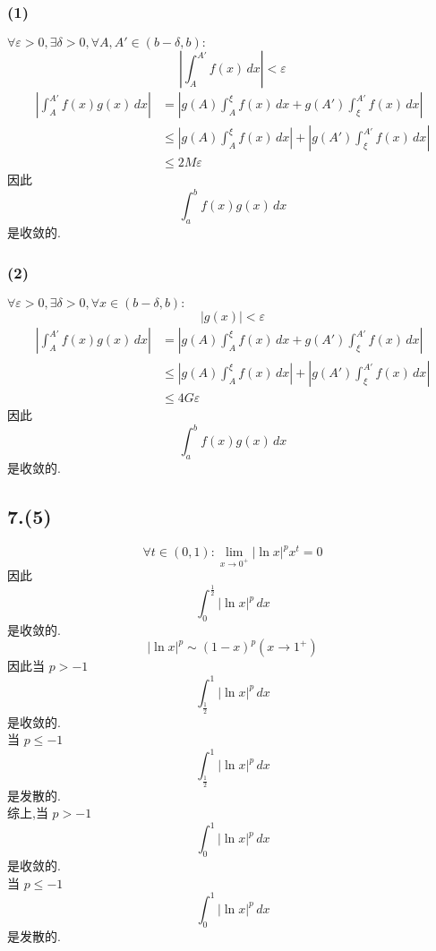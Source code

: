 \documentclass[12pt, a4paper, oneside]{ctexart}
\begin{document}
            \subsubsection*{(1)}
                $\forall \varepsilon > 0, \exists \delta > 0, \forall A,A'\in (b-\delta, b):$
                $$
                    |\int_{A}^{A'}f(x)\,dx|<\varepsilon
                $$
                $$
                    \begin{aligned}
                        |\int_{A}^{A'}f(x)g(x)\,dx|&=|g(A)\int_{A}^{\xi}f(x)\,dx+g(A')\int_{\xi}^{A'}f(x)\,dx|\\
                        &\leq|g(A)\int_{A}^{\xi}f(x)\,dx|+|g(A')\int_{\xi}^{A'}f(x)\,dx|\\
                        &\leq 2M\varepsilon
                    \end{aligned}
                $$
                因此
                $$
                    \int_{a}^{b}f(x)g(x)\,dx
                $$
                是收敛的.
            \subsubsection*{(2)}
                $\forall \varepsilon > 0, \exists \delta > 0, \forall x\in (b-\delta, b):$
                $$
                    |g(x)|<\varepsilon
                $$
                $$
                    \begin{aligned}
                        |\int_{A}^{A'}f(x)g(x)\,dx|&=|g(A)\int_{A}^{\xi}f(x)\,dx+g(A')\int_{\xi}^{A'}f(x)\,dx|\\
                        &\leq|g(A)\int_{A}^{\xi}f(x)\,dx|+|g(A')\int_{\xi}^{A'}f(x)\,dx|\\
                        &\leq 4G\varepsilon
                    \end{aligned}
                $$
                因此
                $$
                    \int_{a}^{b}f(x)g(x)\,dx
                $$
                是收敛的.
        \subsection*{7.(5)}
            $$
                \forall t \in (0,1) : \lim_{x\to 0^+}|\ln x|^px^t=0
            $$
            因此
            $$
                \int_{0}^{\frac12}|\ln x|^p\,dx
            $$
            是收敛的.
            $$
                |\ln x|^{p}\sim (1-x)^p (x\to 1^+)
            $$
            因此当 $p>-1$
            $$
                \int_{\frac12}^{1}|\ln x|^p\,dx
            $$
            是收敛的.\\
            当 $p\leq -1$
            $$
                \int_{\frac12}^{1}|\ln x|^p\,dx
            $$
            是发散的.\\
            综上,当 $p>-1$
            $$
                \int_{0}^{1}|\ln x|^p\,dx
            $$
            是收敛的.\\
            当 $p\leq -1$
            $$
                \int_{0}^{1}|\ln x|^p\,dx
            $$
            是发散的.\\
\end{document}
